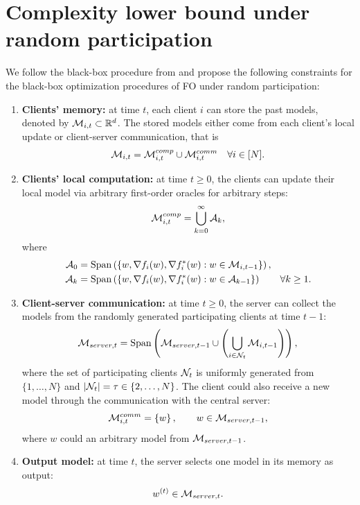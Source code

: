 \section{Complexity lower bound under random participation}
\label{sec:lowerBound}

We follow the black-box procedure from \cite{Scaman2017OptimalAF,Scaman2018OptimalAF} and propose the following constraints for the black-box optimization procedures of FO under random participation:
\begin{enumerate}
    \item \textbf{Clients' memory:} at time $t$, each client $i$ can store the past models, denoted by $\mathcal{M}_{i,t} \subset \mathbb{R}^d$. The stored models  either come from each client's local update or client-server communication, that is
    \[
        \mathcal{M}_{i,t} = \mathcal{M}_{i,t}^{comp} \cup \mathcal{M}_{i,t}^{comm} \quad \forall i \in [N].
    \]
    \item \textbf{Clients' local computation:} at time $t \geq 0$, the clients can update their local model via arbitrary first-order oracles for arbitrary steps:
    \[
        \mathcal{M}_{i,t}^{comp} = \bigcup_{k=0}^{\infty} \mathcal{A}_k,
    \]
    where
    \begin{align*}
        \mathcal{A}_0 &= \mathrm{Span}\left( \left\{  w, \nabla f_i(w), \nabla f_i^*(w) : w \in \mathcal{M}_{i,t-1}  \right\} \right), \\
        \mathcal{A}_k &= \mathrm{Span}\left( \left\{  w, \nabla f_i(w), \nabla f_i^*(w) : w \in \mathcal{A}_{k-1}  \right\} \right) \qquad \forall k \geq 1.
    \end{align*}
    \item \textbf{Client-server communication:} at time $t \geq 0$, the server can collect the models from the randomly generated participating clients at time $t-1$:
    \[
        \mathcal{M}_{server, t} = \mathrm{Span} \left( \mathcal{M}_{server, t-1} \cup  \left( \bigcup_{i \in \mathcal{N}_t} \mathcal{M}_{i, t-1} \right) \right),
    \]
    where the set of participating clients $\mathcal{N}_t$ is uniformly generated from $\{1, \dots, N\}$ and $|\mathcal{N}_t| = \tau \in \{2, \dots, N\}$. The client could also receive a new model through the communication with the central server:
    \[
        \mathcal{M}_{i,t}^{comm} = \left\{ w \right\}, \qquad w \in \mathcal{M}_{server, t-1},
    \]
    where $w$ could an arbitrary model from $\mathcal{M}_{server, t-1}$.
    \item \textbf{Output model:} at time $t$, the server selects one model in its memory as output:
    \[
        w^{(t)} \in \mathcal{M}_{server, t}.
    \]
\end{enumerate}

